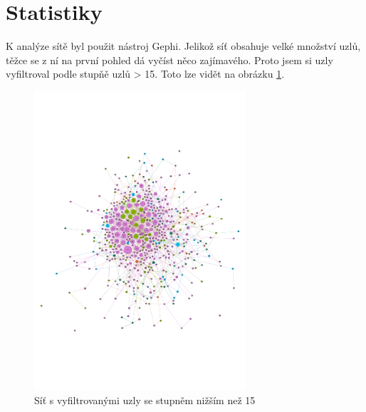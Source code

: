 \documentclass[A4]{article}
\begin{document}
\section{Statistiky}
K analýze sítě byl použit nástroj Gephi. Jelikož síť obsahuje velké množství uzlů, těžce se z ní na první pohled dá vyčíst něco zajímavého.
Proto jsem si uzly vyfiltroval podle stupňě uzlů > 15. Toto lze vidět na obrázku \ref{network:filtered}.

\begin{figure}
    \centering
    \includegraphics[width=0.7\textwidth]{export-filtered.pdf}
    \caption{Síť s vyfiltrovanými uzly se stupněm nižším než 15}
    \label{network:filtered}
\end{figure}

\clearpage
\printbibliography[title={Literatura}, heading=bibintoc]
\end{document}
